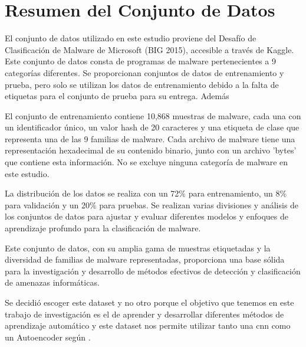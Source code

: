 \section{Resumen del Conjunto de Datos}

El conjunto de datos utilizado en este estudio proviene del Desafío de Clasificación de Malware de Microsoft (BIG 2015), accesible a través de Kaggle. Este conjunto de datos consta de programas de malware pertenecientes a 9 categorías diferentes. Se proporcionan conjuntos de datos de entrenamiento y prueba, pero solo se utilizan los datos de entrenamiento debido a la falta de etiquetas para el conjunto de prueba para su entrega. Además

El conjunto de entrenamiento contiene 10,868 muestras de malware, cada una con un identificador único, un valor hash de 20 caracteres y una etiqueta de clase que representa una de las 9 familias de malware. Cada archivo de malware tiene una representación hexadecimal de su contenido binario, junto con un archivo 'bytes' que contiene esta información. No se excluye ninguna categoría de malware en este estudio.

La distribución de los datos se realiza con un 72\% para entrenamiento, un 8\% para validación y un 20\% para pruebas. Se realizan varias divisiones y análisis de los conjuntos de datos para ajustar y evaluar diferentes modelos y enfoques de aprendizaje profundo para la clasificación de malware.

Este conjunto de datos, con su amplia gama de muestras etiquetadas y la diversidad de familias de malware representadas, proporciona una base sólida para la investigación y desarrollo de métodos efectivos de detección y clasificación de amenazas informáticas.







Se decidió escoger este dataset y no otro porque el objetivo que tenemos en este trabajo de investigación es el de aprender y desarrollar diferentes métodos de aprendizaje automático y este dataset nos permite utilizar tanto una \acrshort{cnn} como un Autoencoder según \citep{podder2021artificial}.












